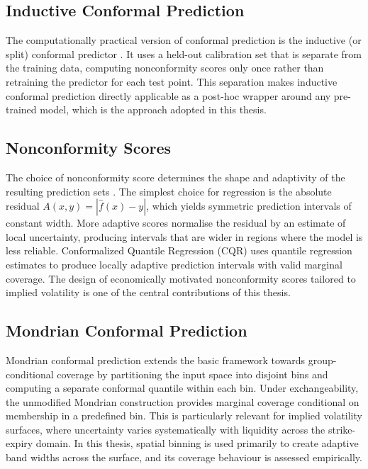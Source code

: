 \subsection{Inductive Conformal Prediction}
\label{subsec:icp}

The computationally practical version of conformal prediction is the inductive (or split) conformal predictor \cite{papadopoulos2002inductive, lei2018distribution, angelopoulos2023gentle}. It uses a held-out calibration set that is separate from the training data, computing nonconformity scores only once rather than retraining the predictor for each test point. This separation makes inductive conformal prediction directly applicable as a post-hoc wrapper around any pre-trained model, which is the approach adopted in this thesis.

\subsection{Nonconformity Scores}
\label{subsec:nonconformity}

The choice of nonconformity score determines the shape and adaptivity of the resulting prediction sets \cite{angelopoulos2023gentle}. The simplest choice for regression is the absolute residual $A(x, y) = |\hat{f}(x) - y|$, which yields symmetric prediction intervals of constant width. More adaptive scores normalise the residual by an estimate of local uncertainty, producing intervals that are wider in regions where the model is less reliable. Conformalized Quantile Regression (CQR) \cite{romano2019conformalized} uses quantile regression estimates to produce locally adaptive prediction intervals with valid marginal coverage. The design of economically motivated nonconformity scores tailored to implied volatility is one of the central contributions of this thesis.

\subsection{Mondrian Conformal Prediction}
\label{subsec:mondrian}

Mondrian conformal prediction \cite{shafer2008tutorial, angelopoulos2023gentle} extends the basic framework towards group-conditional coverage by partitioning the input space into disjoint bins and computing a separate conformal quantile within each bin. Under exchangeability, the unmodified Mondrian construction provides marginal coverage conditional on membership in a predefined bin. This is particularly relevant for implied volatility surfaces, where uncertainty varies systematically with liquidity across the strike-expiry domain. In this thesis, spatial binning is used primarily to create adaptive band widths across the surface, and its coverage behaviour is assessed empirically.

